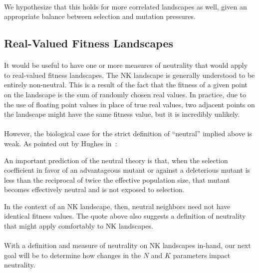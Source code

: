 \documentclass[12pt,letterpaper,titlepage]{article}
\begin{document}
\paragraph{}
We hypothesize that this holds for more correlated landscapes as well, given an
appropriate balance between selection and mutation pressures.

\subsection{Real-Valued Fitness Landscapes}

\paragraph{}
It would be useful to have one or more measures of neutrality that would apply
to real-valued fitness landscapes. The NK landscape is generally understood to
be entirely non-neutral. This is a result of the fact that the fitness of a
given point on the landscape is the sum of randomly chosen real values. In
practice, due to the use of floating point values in place of true real values,
two adjacent points on the landscape might have the same fitness value, but it
is incredibly unlikely.

\paragraph{}
However, the biological case for the strict definition of ``neutral'' implied
above is weak. As pointed out by Hughes in~\cite{Hughes2007}:

\begin{displayquote}
An important prediction of the neutral theory is that, when the selection
coefficient in favor of an advantageous mutant or against a deleterious mutant
is less than the reciprocal of twice the effective population size, that mutant
becomes effectively neutral and is not exposed to selection.
\end{displayquote}

In the context of an NK landscape, then, neutral neighbors need not have
identical fitness values. The quote above also suggests a definition of
neutrality that might apply comfortably to NK landscapes.

\paragraph{}
With a definition and measure of neutrality on NK landscapes in-hand, our next
goal will be to determine how changes in the $N$ and $K$ parameters impact
neutrality.
\end{document}
